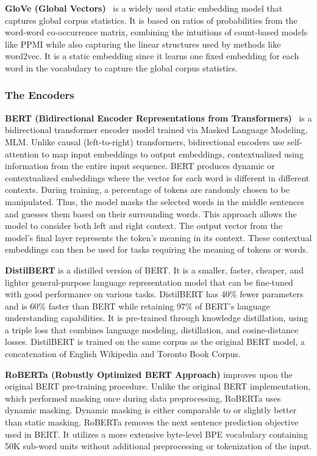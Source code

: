 \textbf{GloVe (Global Vectors)}~\cite{penningtonsochermanning2014} is a widely used static embedding model that captures global corpus statistics. It is based on ratios of probabilities from the word-word co-occurrence matrix, combining the intuitions of count-based models like PPMI while also capturing the linear structures used by methods like word2vec. It is a static embedding since it learns one fixed embedding for each word in the vocabulary to capture the global corpus statistics. \cite{jurafsky2025}

\subsubsection{The Encoders}\label{subsubsec:the-encoders}
\textbf{BERT (Bidirectional Encoder Representations from Transformers)}~\cite{devlin2019} is a bidirectional transformer encoder model trained via Masked Language Modeling, MLM. Unlike causal (left-to-right) transformers, bidirectional encoders use self-attention to map input embeddings to output embeddings, contextualized using information from the entire input sequence. BERT produces dynamic or contextualized embeddings where the vector for each word is different in different contexts. During training, a percentage of tokens are randomly chosen to be manipulated. Thus, the model masks the selected words in the middle sentences and guesses them based on their surrounding words. This approach allows the model to consider both left and right context. The output vector from the model's final layer represents the token's meaning in its context. These contextual embeddings can then be used for tasks requiring the meaning of tokens or words. \cite{jurafsky2025}

\textbf{DistilBERT} is a distilled version of BERT. It is a smaller, faster, cheaper, and lighter general-purpose language representation model that can be fine-tuned with good performance on various tasks. DistilBERT has 40{\%} fewer parameters and is 60{\%} faster than BERT while retaining 97{\%} of BERT's language understanding capabilities. It is pre-trained through knowledge distillation, using a triple loss that combines language modeling, distillation, and cosine-distance losses. DistilBERT is trained on the same corpus as the original BERT model, a concatenation of English Wikipedia and Toronto Book Corpus. \cite{sanh2020}

\textbf{RoBERTa (Robustly Optimized BERT Approach)} improves upon the original BERT pre-training procedure. Unlike the original BERT implementation, which performed masking once during data preprocessing, RoBERTa uses dynamic masking. Dynamic masking is either comparable to or slightly better than static masking. RoBERTa removes the next sentence prediction objective used in BERT\@. It utilizes a more extensive byte-level BPE vocabulary containing 50K sub-word units without additional preprocessing or tokenization of the input. \cite{liu2019}

